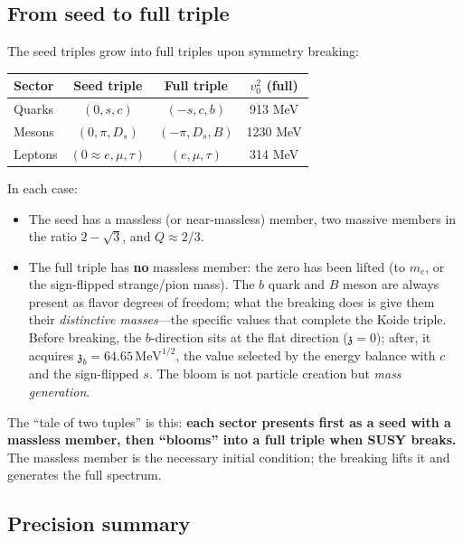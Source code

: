 \documentclass[12pt,a4paper]{article}
\newcommand{\MeV}{\,\text{MeV}}
\newcommand{\zch}{\mathfrak{z}}
\begin{document}
\subsection{From seed to full triple}

The seed triples grow into full triples upon symmetry breaking:

\begin{center}
\begin{tabular}{lccc}
\toprule
Sector & Seed triple & Full triple & $v_0^2$ (full) \\
\midrule
Quarks & $(0, s, c)$ & $(-s, c, b)$ & 913 MeV \\
Mesons & $(0, \pi, D_s)$ & $(-\pi, D_s, B)$ & 1230 MeV \\
Leptons & $(0 \approx e, \mu, \tau)$ & $(e, \mu, \tau)$ & 314 MeV \\
\bottomrule
\end{tabular}
\end{center}

In each case:
\begin{itemize}
\item The seed has a massless (or near-massless) member, two massive
members in the ratio $2 - \sqrt{3}$, and $Q \approx 2/3$.
\item The full triple has \textbf{no} massless member: the zero has
been lifted (to $m_e$, or the sign-flipped strange/pion mass). The
$b$ quark and $B$ meson are always present as flavor degrees of
freedom; what the breaking does is give them their \emph{distinctive
masses}---the specific values that complete the Koide triple. Before
breaking, the $b$-direction sits at the flat direction ($\zch = 0$);
after, it acquires $\zch_b = 64.65\MeV^{1/2}$, the value selected
by the energy balance with $c$ and the sign-flipped $s$. The bloom
is not particle creation but \emph{mass generation}.
\end{itemize}

The ``tale of two tuples'' is this: \textbf{each sector presents
first as a seed with a massless member, then ``blooms'' into a
full triple when SUSY breaks.} The massless member is the necessary
initial condition; the breaking lifts it and generates the full spectrum.

\subsection{Precision summary}
\end{document}
